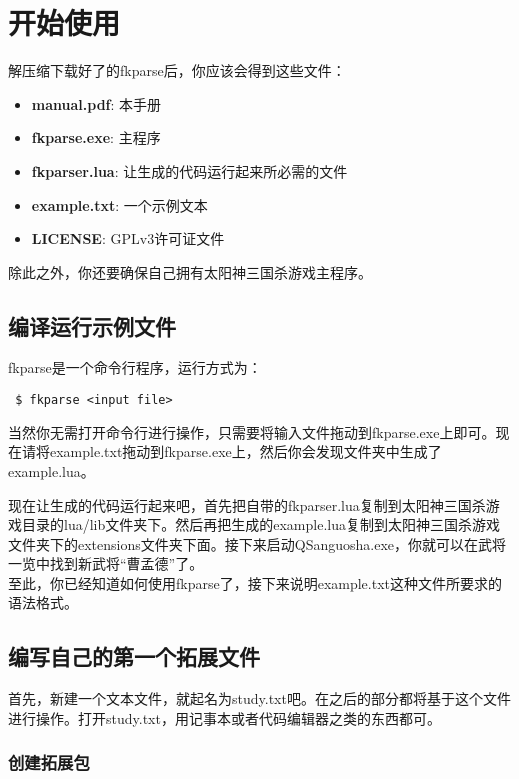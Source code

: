 \chapter{开始使用}

解压缩下载好了的fkparse后，你应该会得到这些文件：

\begin{itemize}
 \item \textbf{manual.pdf}: 本手册
 \item \textbf{fkparse.exe}: 主程序
 \item \textbf{fkparser.lua}: 让生成的代码运行起来所必需的文件
 \item \textbf{example.txt}: 一个示例文本
 \item \textbf{LICENSE}: GPLv3许可证文件
\end{itemize}

除此之外，你还要确保自己拥有太阳神三国杀游戏主程序。

\section{编译运行示例文件}

fkparse是一个命令行程序，运行方式为：

\begin{verbatim}
 $ fkparse <input file>
\end{verbatim}

当然你无需打开命令行进行操作，只需要将输入文件拖动到fkparse.exe上即可。现在请将example.txt拖动到fkparse.exe上，然后你会发现文件夹中生成了example.lua。

现在让生成的代码运行起来吧，首先把自带的fkparser.lua复制到太阳神三国杀游戏目录的lua/lib文件夹下。然后再把生成的example.lua复制到太阳神三国杀游戏文件夹下的extensions文件夹下面。接下来启动QSanguosha.exe，你就可以在武将一览中找到新武将“曹孟德”了。\\

至此，你已经知道如何使用fkparse了，接下来说明example.txt这种文件所要求的语法格式。

\section{编写自己的第一个拓展文件}

首先，新建一个文本文件，就起名为study.txt吧。在之后的部分都将基于这个文件进行操作。打开study.txt，用记事本或者代码编辑器之类的东西都可。

\subsection{创建拓展包}

